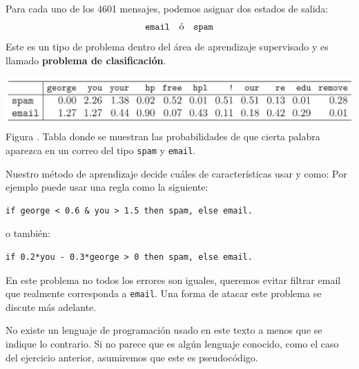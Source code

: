 \documentclass[12pt]{report}
\newcounter{it}
\theoremstyle{largebreak}
\newcounter{figcount}
\begin{document}
    \begin{sol}
        Para cada uno de los 4601 mensajes, podemos asignar dos estados de salida:
        \begin{equation*}
            \textup{\texttt{email}}\quad\textup{ó}\quad\textup{\texttt{spam}}
        \end{equation*}
        Este es un tipo de problema dentro del área de aprendizaje supervisado y es llamado \textbf{problema de clasificación}.

        \begin{minipage}{\textwidth}
            \begin{center}
                \includegraphics[scale=0.4]{images/table_1.png}\\
                Figura \thefigcount. Tabla donde se muestran las probabilidades de que cierta palabra aparezca en un correo del tipo \texttt{spam} y \texttt{email}.
            \end{center}
        \end{minipage}

        Nuestro método de aprendizaje decide cuáles de características usar y como: Por ejemplo puede usar una regla como la siguiente:

        \begin{lstlisting}
if george < 0.6 & you > 1.5 then spam, else email. 
        \end{lstlisting}

        o también:

        \begin{lstlisting}
if 0.2*you - 0.3*george > 0 then spam, else email.
        \end{lstlisting}

        En este problema no todos los errores son iguales, queremos evitar filtrar email que realmente corresponda a \texttt{email}. Una forma de atacar este problema se discute más adelante.
    \end{sol}

    \begin{obs}
        No existe un lenguaje de programación usado en este texto a menos que se indique lo contrario. Si no parece que es algún lenguaje conocido, como el caso del ejercicio anterior, asumiremos que este es pseudocódigo.
    \end{obs}
\end{document}

